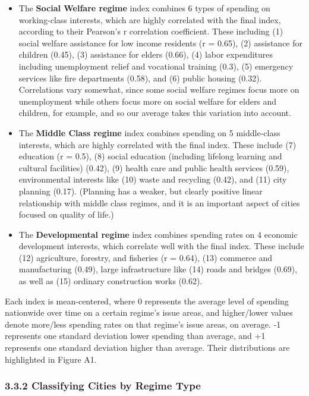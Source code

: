 \documentclass[preprint, 3p,
authoryear]{elsarticle} %
\begin{document}
\begin{itemize}
\item
  The \textbf{Social Welfare regime} index combines 6 types of spending
  on working-class interests, which are highly correlated with the final
  index, according to their Pearson's r correlation coefficient. These
  including (1) social welfare assistance for low income residents (r =
  0.65), (2) assistance for children (0.45), (3) assistance for elders
  (0.66), (4) labor expenditures including unemployment relief and
  vocational training (0.3), (5) emergency services like fire
  departments (0.58), and (6) public housing (0.32). Correlations vary
  somewhat, since some social welfare regimes focus more on unemployment
  while others focus more on social welfare for elders and children, for
  example, and so our average takes this variation into account.
\item
  The \textbf{Middle Class regime} index combines spending on 5
  middle-class interests, which are highly correlated with the final
  index. These include (7) education (r = 0.5), (8) social education
  (including lifelong learning and cultural facilities) (0.42), (9)
  health care and public health services (0.59), environmental interests
  like (10) waste and recycling (0.42), and (11) city planning (0.17).
  (Planning has a weaker, but clearly positive linear relationship with
  middle class regimes, and it is an important aspect of cities focused
  on quality of life.)
\item
  The \textbf{Developmental regime} index combines spending rates on 4
  economic development interests, which correlate well with the final
  index. These include (12) agriculture, forestry, and fisheries (r =
  0.64), (13) commerce and manufacturing (0.49), large infrastructure
  like (14) roads and bridges (0.69), as well as (15) ordinary
  construction works (0.62).
\end{itemize}

Each index is mean-centered, where 0 represents the average level of
spending nationwide over time on a certain regime's issue areas, and
higher/lower values denote more/less spending rates on that regime's
issue areas, on average. -1 represents one standard deviation lower
spending than average, and +1 represents one standard deviation higher
than average. Their distributions are highlighted in Figure A1.

\hypertarget{classifying-cities-by-regime-type}{%
\subsubsection{3.3.2 Classifying Cities by Regime
Type}\label{classifying-cities-by-regime-type}}
\end{document}
